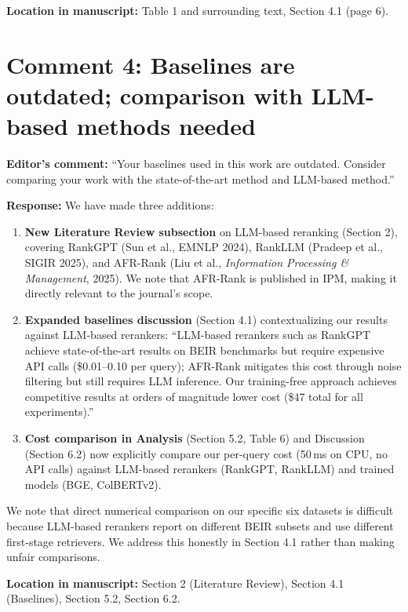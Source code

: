 \documentclass[11pt]{article}
\begin{document}
\textbf{Location in manuscript:} Table 1 and surrounding text, Section 4.1 (page 6).

\section*{Comment 4: Baselines are outdated; comparison with LLM-based methods needed}

\textbf{Editor's comment:} ``Your baselines used in this work are outdated. Consider comparing your work with the state-of-the-art method and LLM-based method.''

\textbf{Response:} We have made three additions:

\begin{enumerate}[leftmargin=*]
\item \textbf{New Literature Review subsection} on LLM-based reranking (Section 2), covering RankGPT (Sun et al., EMNLP 2024), RankLLM (Pradeep et al., SIGIR 2025), and AFR-Rank (Liu et al., \textit{Information Processing \& Management}, 2025). We note that AFR-Rank is published in IPM, making it directly relevant to the journal's scope.

\item \textbf{Expanded baselines discussion} (Section 4.1) contextualizing our results against LLM-based rerankers: ``LLM-based rerankers such as RankGPT achieve state-of-the-art results on BEIR benchmarks but require expensive API calls (\$0.01--0.10 per query); AFR-Rank mitigates this cost through noise filtering but still requires LLM inference. Our training-free approach achieves competitive results at orders of magnitude lower cost (\$47 total for all experiments).''

\item \textbf{Cost comparison in Analysis} (Section 5.2, Table 6) and Discussion (Section 6.2) now explicitly compare our per-query cost (50\,ms on CPU, no API calls) against LLM-based rerankers (RankGPT, RankLLM) and trained models (BGE, ColBERTv2).
\end{enumerate}

We note that direct numerical comparison on our specific six datasets is difficult because LLM-based rerankers report on different BEIR subsets and use different first-stage retrievers. We address this honestly in Section 4.1 rather than making unfair comparisons.

\textbf{Location in manuscript:} Section 2 (Literature Review), Section 4.1 (Baselines), Section 5.2, Section 6.2.
\end{document}

